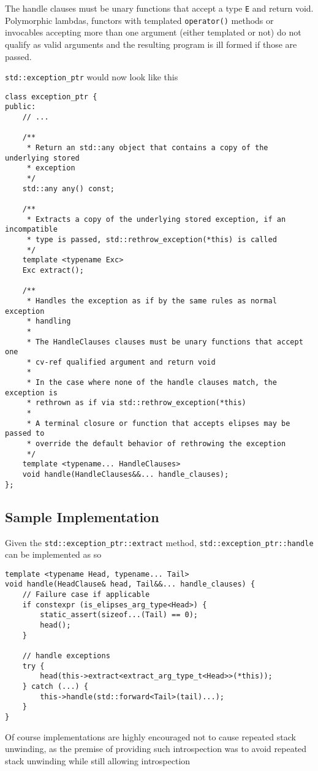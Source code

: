 \documentclass{article}
\begin{document}
The handle clauses must be unary functions that accept a type \texttt{E} and
return void.  Polymorphic lambdas, functors with templated \texttt{operator()}
methods or invocables accepting more than one argument (either templated or
not) do not qualify as valid arguments and the resulting program is ill formed
if those are passed.

\texttt{std::exception\_ptr} would now look like this
\begin{lstlisting}
class exception_ptr {
public:
    // ...

    /**
     * Return an std::any object that contains a copy of the underlying stored
     * exception
     */
    std::any any() const;

    /**
     * Extracts a copy of the underlying stored exception, if an incompatible
     * type is passed, std::rethrow_exception(*this) is called
     */
    template <typename Exc>
    Exc extract();

    /**
     * Handles the exception as if by the same rules as normal exception
     * handling
     *
     * The HandleClauses clauses must be unary functions that accept one
     * cv-ref qualified argument and return void
     *
     * In the case where none of the handle clauses match, the exception is
     * rethrown as if via std::rethrow_exception(*this)
     *
     * A terminal closure or function that accepts elipses may be passed to
     * override the default behavior of rethrowing the exception
     */
    template <typename... HandleClauses>
    void handle(HandleClauses&&... handle_clauses);
};
\end{lstlisting}

\subsection{Sample Implementation}
Given the \texttt{std::exception\_ptr::extract} method,
\texttt{std::exception\_ptr::handle} can be implemented as so
\begin{lstlisting}
template <typename Head, typename... Tail>
void handle(HeadClause& head, Tail&&... handle_clauses) {
    // Failure case if applicable
    if constexpr (is_elipses_arg_type<Head>) {
        static_assert(sizeof...(Tail) == 0);
        head();
    }

    // handle exceptions
    try {
        head(this->extract<extract_arg_type_t<Head>>(*this));
    } catch (...) {
        this->handle(std::forward<Tail>(tail)...);
    }
}
\end{lstlisting}

Of course implementations are highly encouraged not to cause repeated stack
unwinding, as the premise of providing such introspection was to avoid
repeated stack unwinding while still allowing introspection
\end{document}

